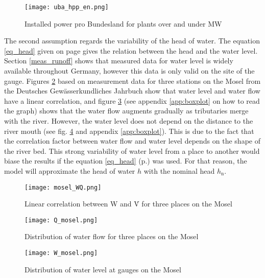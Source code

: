 \begin{figure}[H]
\centering
\texttt{[image: uba\_hpp\_en.png]}
\caption[Installed power pro Bundesland for plants over and under {\unit[1]{MW}}]{Installed power pro Bundesland for plants over and under {\unit[1]{MW}} \cite{uba_wasserkraft}}
\label{uba_hpp}
\end{figure}

The second assumption regards the variability of the head of water. The equation \ref{eq_head} given on page \pageref{eq_head} gives the relation between the head and the water level. Section \ref{meas_runoff} shows that measured data for water level is widely available throughout Germany, however this data is only valid on the site of the gauge. Figures \ref{mosel_WQ} based on measurement data for three stations on the Mosel from the Deutsches Gewässerkundliches Jahrbuch show that water level and water flow have a linear correlation, and figure \ref{Q_mosel} (see appendix \ref{app:boxplot} on how to read the graph) shows that the water flow augments gradually as tributaries merge with the river. However, the water level does not depend on the distance to the river mouth (see fig. \ref{W_mosel} and appendix \ref{app:boxplot}). This is due to the fact that the correlation factor between water flow and water level depends on the shape of the river bed. This strong variability of water level from a place to another would biase the results if the equation \ref{eq_head} (p.\pageref{eq_head}) was used. For that reason, the model will approximate the head of water $h$ with the nominal head $h_\mathrm{n}$.

\begin{figure}[H]
\centering
\texttt{[image: mosel\_WQ.png]}
\caption[Linear correlation between W and  \.{V} for three places on the Mosel]{Linear correlation between W and  \.{V} for three places on the Mosel}
\label{mosel_WQ}
\end{figure}

\begin{figure}[H]
\centering
\texttt{[image: Q\_mosel.png]}
\caption[Distribution of water flow for three places on the Mosel]{Distribution of water flow for three places on the Mosel}
\label{Q_mosel}
\end{figure}

\begin{figure}[H]
\centering
\texttt{[image: W\_mosel.png]}
\caption[Distribution of water level at gauges on the Mosel]{Distribution of water level at gauges on the Mosel}
\label{W_mosel}
\end{figure}



